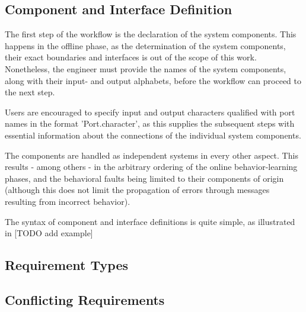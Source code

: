 \subsection{Component and Interface Definition} \label{subs_compdef}
The first step of the workflow is the declaration of the system components. This happens in the offline phase, as the determination of the system components, their exact boundaries and interfaces is out of the scope of this work. Nonetheless, the engineer must provide the names of the system components, along with their input- and output alphabets, before the workflow can proceed to the next step.

Users are encouraged to specify input and output characters qualified with port names in the format 'Port.character', as this supplies the subsequent steps with essential information about the connections of the individual system components.

The components are handled as independent systems in every other aspect. This results - among others - in the arbitrary ordering of the online behavior-learning phases, and the behavioral faults being limited to their components of origin (although this does not limit the propagation of errors through messages resulting from incorrect behavior).

The syntax of component and interface definitions is quite simple, as illustrated in [TODO add example]

\subsection{Requirement Types} \label{subs_reqtypes}
\subsection{Conflicting Requirements} \label{subs_conf}


